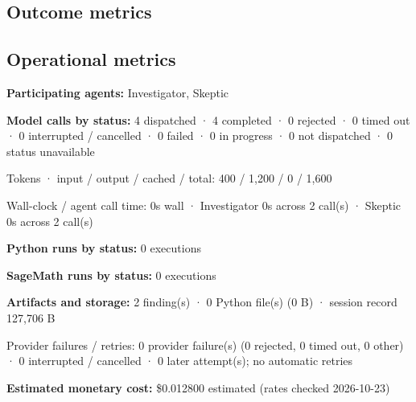 \documentclass[11pt]{article}
\begin{document}
\subsection{Outcome metrics}
\subsection{Operational metrics}
\textbf{Participating agents:} Investigator, Skeptic\par
\textbf{Model calls by status:} 4 dispatched · 4 completed · 0 rejected · 0 timed out · 0 interrupted / cancelled · 0 failed · 0 in progress · 0 not dispatched · 0 status unavailable\par
Tokens · input / output / cached / total: 400 / 1,200 / 0 / 1,600\par
Wall-clock / agent call time: 0s wall · Investigator 0s across 2 call(s) · Skeptic 0s across 2 call(s)\par
\textbf{Python runs by status:} 0 executions\par
\textbf{SageMath runs by status:} 0 executions\par
\textbf{Artifacts and storage:} 2 finding(s) · 0 Python file(s) (0 B) · session record 127,706 B\par
Provider failures / retries: 0 provider failure(s) (0 rejected, 0 timed out, 0 other) · 0 interrupted / cancelled · 0 later attempt(s); no automatic retries\par
\textbf{Estimated monetary cost:} \$0.012800 estimated (rates checked 2026-10-23)\par
\end{document}
